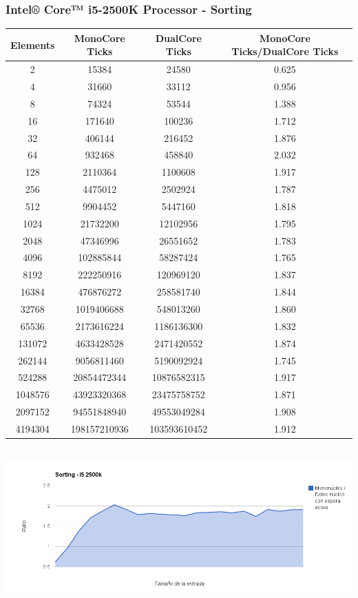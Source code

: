 \subsubsection{Intel® Core™ i5-2500K Processor - Sorting}
\begin{center}
	\begin{tabular}{|c|c|c|c|}
		\hline	
			Elements & MonoCore Ticks & DualCore Ticks & MonoCore Ticks/DualCore Ticks\\
		\hline
			2 & 15384 & 24580 & 0.625\\
		\hline
			4 & 31660 & 33112 & 0.956\\
		\hline
			8 & 74324 & 53544 & 1.388\\
		\hline
			16 & 171640 & 100236 & 1.712\\
		\hline
			32 & 406144 & 216452 & 1.876\\
		\hline
			64 & 932468 & 458840 & 2.032\\
		\hline
			128 & 2110364 & 1100608 & 1.917\\
		\hline
			256 & 4475012 & 2502924 & 1.787\\
		\hline
			512 & 9904452 & 5447160 & 1.818\\
		\hline
			1024 & 21732200 & 12102956 & 1.795\\
		\hline
			2048 & 47346996 & 26551652 & 1.783\\
		\hline
			4096 & 102885844 & 58287424 & 1.765\\
		\hline
			8192 & 222250916 & 120969120 & 1.837\\
		\hline
			16384 & 476876272 & 258581740 & 1.844\\
		\hline
			32768 & 1019406688 & 548013260 & 1.860\\
		\hline
			65536 & 2173616224 & 1186136300 & 1.832\\
		\hline
			131072 & 4633428528 & 2471420552 & 1.874\\
		\hline
			262144 & 9056811460 & 5190092924 & 1.745\\
		\hline
			524288 & 20854472344 & 10876582315 & 1.917\\
		\hline
			1048576 & 43923320368 & 23475758752 & 1.871\\
		\hline
			2097152 & 94551848940 & 49553049284 & 1.908\\
		\hline
			4194304 & 198157210936 & 103593610452 & 1.912\\
		\hline
	\end{tabular}
\end{center}
	\begin{center}
	    \includegraphics[height=6cm]{images/i5_sorting.png}
	\end{center}

